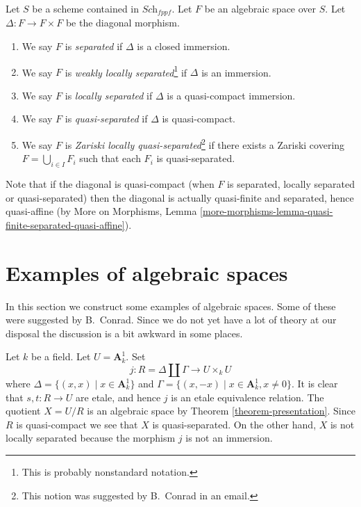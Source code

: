\begin{definition}
\label{definition-separated}
Let $S$ be a scheme contained in $\textit{Sch}_{fppf}$.
Let $F$ be an algebraic space over $S$.
Let $\Delta : F \to F \times F$ be the diagonal morphism.
\begin{enumerate}
\item We say $F$ is {\it separated} if $\Delta$ is a closed immersion.
\item We say $F$ is {\it weakly locally separated}\footnote{This is probably
nonstandard notation.} if $\Delta$ is an
immersion.
\item We say $F$ is {\it locally separated} if $\Delta$ is a
quasi-compact immersion.
\item We say $F$ is {\it quasi-separated} if $\Delta$ is quasi-compact.
\item We say $F$ is {\it Zariski locally quasi-separated}\footnote{
This notion was suggested by B.\ Conrad in an email.} if there
exists a Zariski covering $F = \bigcup_{i \in I} F_i$ such that
each $F_i$ is quasi-separated.
\end{enumerate}
\end{definition}

\noindent
Note that if the diagonal is quasi-compact (when $F$ is separated,
locally separated or quasi-separated) then the diagonal is actually
quasi-finite and separated, hence quasi-affine (by More on Morphisms,
Lemma \ref{more-morphisms-lemma-quasi-finite-separated-quasi-affine}).








\section{Examples of algebraic spaces}
\label{section-examples}

\noindent
In this section we construct some examples of algebraic spaces.
Some of these were suggested by B.\ Conrad.
Since we do not yet have a lot of theory at our disposal the
discussion is a bit awkward in some places.

\begin{example}
\label{example-affine-line-involution}
Let $k$ be a field. Let $U = \mathbf{A}^1_k$. Set
$$
j : R = \Delta \coprod \Gamma \longrightarrow U \times_k U
$$
where $\Delta = \{(x, x) \mid x \in \mathbf{A}^1_k\}$ and
$\Gamma = \{(x, -x) \mid x \in \mathbf{A}^1_k, x \not = 0\}$.
It is clear that $s, t : R \to U$ are etale, and hence
$j$ is an etale equivalence relation.
The quotient $X = U/R$ is an algebraic space by
Theorem \ref{theorem-presentation}.
Since $R$ is quasi-compact we see that $X$ is quasi-separated.
On the other hand, $X$ is not locally separated because
the morphism $j$ is not an immersion.
\end{example}

